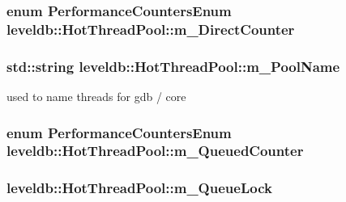 \subsubsection[{m\+\_\+\+Direct\+Counter}]{\setlength{\rightskip}{0pt plus 5cm}enum {\bf Performance\+Counters\+Enum} leveldb\+::\+Hot\+Thread\+Pool\+::m\+\_\+\+Direct\+Counter}\label{classleveldb_1_1_hot_thread_pool_addcf8d7da65f452d5bb0d2e96facd741}
\hypertarget{classleveldb_1_1_hot_thread_pool_a03b0d2067849f04918927772f5b44770}{}
\subsubsection[{m\+\_\+\+Pool\+Name}]{\setlength{\rightskip}{0pt plus 5cm}std\+::string leveldb\+::\+Hot\+Thread\+Pool\+::m\+\_\+\+Pool\+Name}\label{classleveldb_1_1_hot_thread_pool_a03b0d2067849f04918927772f5b44770}


used to name threads for gdb / core 

\hypertarget{classleveldb_1_1_hot_thread_pool_aac7b6600773035c7499721eb42ab2075}{}
\subsubsection[{m\+\_\+\+Queued\+Counter}]{\setlength{\rightskip}{0pt plus 5cm}enum {\bf Performance\+Counters\+Enum} leveldb\+::\+Hot\+Thread\+Pool\+::m\+\_\+\+Queued\+Counter}\label{classleveldb_1_1_hot_thread_pool_aac7b6600773035c7499721eb42ab2075}
\hypertarget{classleveldb_1_1_hot_thread_pool_a37f97bceb4dc661a524433f6c5459cd1}{}
\subsubsection[{m\+\_\+\+Queue\+Lock}]{ leveldb\+::\+Hot\+Thread\+Pool\+::m\+\_\+\+Queue\+Lock}\label{classleveldb_1_1_hot_thread_pool_a37f97bceb4dc661a524433f6c5459cd1}


